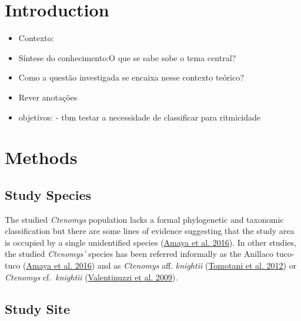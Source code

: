 \documentclass[english,msc,numbers,hidelinks]{coppe}
\providecommand{\tightlist}{%
  \setlength{\itemsep}{0pt}\setlength{\parskip}{0pt}}
\begin{document}
  \hypertarget{introduction}{%
  \section{Introduction}\label{introduction}}
  \begin{itemize}
  \tightlist
  \item
    Contexto:
  \item
    Síntese do conhecimento:O que se sabe sobe o tema central?
  \item
    Como a questão investigada se encaixa nesse contexto teórico?
  \item
    Rever anotações
  \item
    objetivos: - tbm testar a necessidade de classificar para ritmicidade
  \end{itemize}
  \hypertarget{methods}{%
  \section{Methods}\label{methods}}

  \hypertarget{study-species}{%
  \subsection{Study Species}\label{study-species}}

  The studied \emph{Ctenomys} population lacks a formal phylogenetic and taxonomic classification but there are some lines of evidence suggesting that the study area is occupied by a single unidentified species (\protect\hyperlink{ref-amaya2016}{Amaya et al. 2016}). In other studies, the studied \emph{Ctenomys'} species has been referred informally as the Anillaco tuco-tuco (\protect\hyperlink{ref-amaya2016}{Amaya et al. 2016}) and as \emph{Ctenomys} aff. \emph{knightii} (\protect\hyperlink{ref-tomotani2012}{Tomotani et al. 2012}) or \emph{Ctenomys} cf.~\emph{knightii} (\protect\hyperlink{ref-valentinuzzi2009}{Valentinuzzi et al. 2009}).

  \hypertarget{study-site}{%
  \subsection{Study Site}\label{study-site}}
\end{document}
